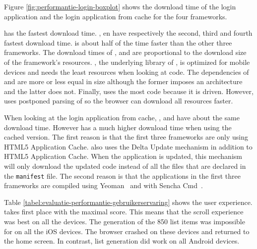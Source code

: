 \documentclass[a4paper]{artikel3}
\newcommand{\code}[1]{\texttt{#1}}
\newcommand{\setspace}[0]{\vspace{2mm}}
\renewcommand{\paragraph}[1]{\setspace \noindent {\bf #1}  }
\begin{document}

\paragraph{Average download time}
Figure \ref{fig:performantie-login-boxplot} shows the download time of the login application and the login application from cache for the four frameworks. 

\lungo{} has the fastest download time.
\jqm{},  \kendoa{} en \sta{} have respectively the second, third and fourth fastest download time.
\lungo{} is about half of the time faster than the other three frameworks.
The download times of \kendoa{}, \jqma{} and \lungo{} are proportional to the download size of the framework's resources.
\quo{},  the underlying \js{} library of \lungo{},  is optimized for mobile devices and needs the least resources when looking at code.
The \js{} dependencies of \kendoa{} and \jqma{} are more or less equal in size although the former imposes an architecture and the latter does not.
Finally,  \sta{} uses the most \js{} code because it is \js{} driven.
However,  \sta{} uses postponed parsing of \js{} so the browser can download all \js{} resources faster.

When looking at the login application from cache, \kendoa{}, \jqma{} and \lungo{} have about the same download time.
However \sta{} has a much higher download time when using the cached version.
The first reason is that the first three frameworks are only using HTML5 Application Cache.
\sta{} also uses the Delta Update mechanism in addition to HTML5 Application Cache.
When the application is updated,  this mechanism will only download the updated code instead of all the files that are declared in the \code{manifest} file.
The second reason is that the applications in the first three frameworks are compiled using Yeoman~\cite{Yeoman2013} and \st{} with Sencha Cmd~\cite{Sencha2012}.


\paragraph{User experience}
Table \ref{tabel:evaluatie-performantie-gebruikerservaring} shows the user experience.
\sta{} takes first place with the maximal score.
This means that the scroll experience was best on all the devices.
The generation of the 850 list items was impossible for \kendoa{} on all the iOS devices.
The browser crashed on these devices and returned to the home screen.
In contrast, list generation did work on all Android devices.
\end{document}
